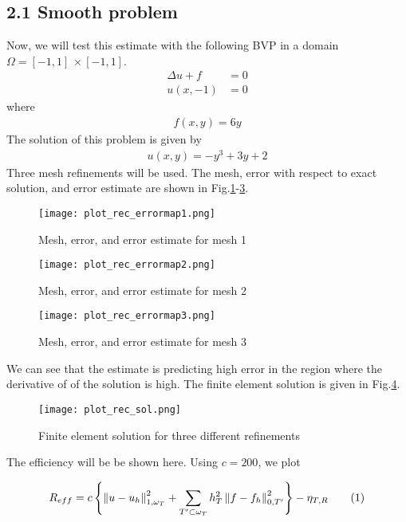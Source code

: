 \documentclass[11pt, letterpaper, hidelinks]{article}
\theoremstyle{definition}
\newcommand\numberthis{\addtocounter{equation}{1}\tag{\theequation}}
\newcommand{\x}{\, \times}
\newcommand{\norm}[1]{\left\lVert#1\right\rVert}
\begin{document}
\subsection{2.1 Smooth problem}
Now, we will test this estimate with the following BVP in a domain $\Omega = [-1,1]\x[-1,1]$.
\begin{align*}
    \Delta u + f & = 0 \\
    u(x,-1)      & = 0
\end{align*}
where
\begin{align*}
    f(x,y) = 6y
\end{align*}
The solution of this problem is given by
\begin{align*}
    u(x,y) = -y^3 + 3y + 2
\end{align*}
Three mesh refinements will be used. The mesh, error with respect to exact solution, and error estimate are shown in Fig.\ref{fig:rec_errmap1}-\ref{fig:rec_errmap3}.

\begin{figure}[H]
    \texttt{[image: plot\_rec\_errormap1.png]}
    \centering
    \caption{Mesh, error, and error estimate for mesh 1}
    \label{fig:rec_errmap1}
\end{figure}

\begin{figure}[H]
    \texttt{[image: plot\_rec\_errormap2.png]}
    \centering
    \caption{Mesh, error, and error estimate for mesh 2}
    \label{fig:rec_errmap2}
\end{figure}

\begin{figure}[H]
    \texttt{[image: plot\_rec\_errormap3.png]}
    \centering
    \caption{Mesh, error, and error estimate for mesh 3}
    \label{fig:rec_errmap3}
\end{figure}

We can see that the estimate is predicting high error in the region where the derivative of of the solution is high. The finite element solution is given in Fig.\ref{fig:rec_sol}.

\begin{figure}[H]
    \texttt{[image: plot\_rec\_sol.png]}
    \centering
    \caption{Finite element solution for three different refinements}
    \label{fig:rec_sol}
\end{figure}

The efficiency will be be shown here. Using $c=200$, we plot

\begin{align*}
    R_{eff} =  c \left\{ \norm{u-u_h}_{1,\omega_T}^2 + \sum_{T^{\prime} \subset \omega_T} h^2_T \norm{f-f_h}_{0,T^{\prime}}^2 \right\} - \eta_{T,R} \numberthis \label{eff}
\end{align*}
\end{document}
